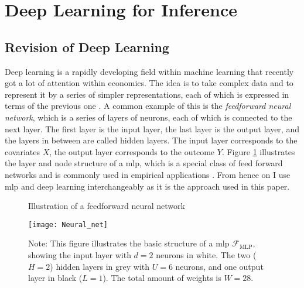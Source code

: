 \section{Deep Learning for Inference}

\subsection{Revision of Deep Learning}
Deep learning is a rapidly developing field within machine learning that recently got a lot of attention within economics.
The idea is to take complex data and to represent it by a series of simpler representations, each of which is expressed in terms of the previous one \citep{Goodfellow-et-al-2016}.
A common example of this is the \textit{feedforward neural network}, which is a series of layers of neurons, each of which is connected to the next layer.
The first layer is the input layer, the last layer is the output layer, and the layers in between are called hidden layers.
The input layer corresponds to the covariates $X$, the output layer corresponds to the outcome $Y$.
Figure \ref{fig:1} illustrates the layer and node structure of a \ac{mlp}, which is a special class of feed forward networks and is commonly used in empirical applications \citep{farrellDeepNeuralNetworks2021}.
From hence on I use \ac{mlp} and deep learning interchangeably as it is the approach used in this paper.

\begin{figure}%
\centering
\caption{Illustration of a feedforward neural network \citep{farrellDeepNeuralNetworks2021}}
\texttt{[image: Neural\_net]}
\caption*{Note: This figure illustrates the basic structure of a \ac{mlp} $\mathcal{F}_{\text{MLP}}$, showing the input layer with $d=2$ neurons in white. The two ($H=2$) hidden layers in grey with $U=6$ neurons, and one output layer in black ($L=1$). The total amount of weights is $W=28$.}
\label{fig:1}
\end{figure}

